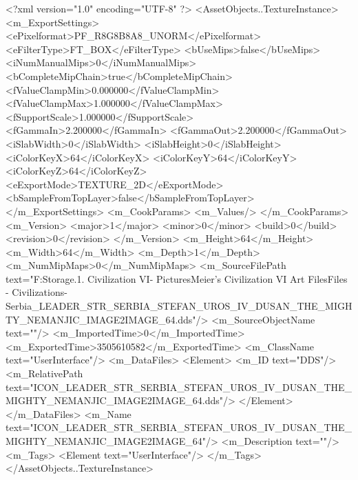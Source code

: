 <?xml version="1.0" encoding="UTF-8" ?>
<AssetObjects..TextureInstance>
	<m_ExportSettings>
		<ePixelformat>PF_R8G8B8A8_UNORM</ePixelformat>
		<eFilterType>FT_BOX</eFilterType>
		<bUseMips>false</bUseMips>
		<iNumManualMips>0</iNumManualMips>
		<bCompleteMipChain>true</bCompleteMipChain>
		<fValueClampMin>0.000000</fValueClampMin>
		<fValueClampMax>1.000000</fValueClampMax>
		<fSupportScale>1.000000</fSupportScale>
		<fGammaIn>2.200000</fGammaIn>
		<fGammaOut>2.200000</fGammaOut>
		<iSlabWidth>0</iSlabWidth>
		<iSlabHeight>0</iSlabHeight>
		<iColorKeyX>64</iColorKeyX>
		<iColorKeyY>64</iColorKeyY>
		<iColorKeyZ>64</iColorKeyZ>
		<eExportMode>TEXTURE_2D</eExportMode>
		<bSampleFromTopLayer>false</bSampleFromTopLayer>
	</m_ExportSettings>
	<m_CookParams>
		<m_Values/>
	</m_CookParams>
	<m_Version>
		<major>1</major>
		<minor>0</minor>
		<build>0</build>
		<revision>0</revision>
	</m_Version>
	<m_Height>64</m_Height>
	<m_Width>64</m_Width>
	<m_Depth>1</m_Depth>
	<m_NumMipMaps>0</m_NumMipMaps>
	<m_SourceFilePath text="F:\Mod Storage\2.1. Civilization VI\Mods\Archive - Pictures\Sid Meier's Civilization VI Art Files\Art Files - Civilizations\Civilization - Serbia\ICON_LEADER_STR_SERBIA_STEFAN_UROS_IV_DUSAN_THE_MIGHTY_NEMANJIC_IMAGE2IMAGE_64.dds"/>
	<m_SourceObjectName text=""/>
	<m_ImportedTime>0</m_ImportedTime>
	<m_ExportedTime>3505610582</m_ExportedTime>
	<m_ClassName text="UserInterface"/>
	<m_DataFiles>
		<Element>
			<m_ID text="DDS"/>
			<m_RelativePath text="ICON_LEADER_STR_SERBIA_STEFAN_UROS_IV_DUSAN_THE_MIGHTY_NEMANJIC_IMAGE2IMAGE_64.dds"/>
		</Element>
	</m_DataFiles>
	<m_Name text="ICON_LEADER_STR_SERBIA_STEFAN_UROS_IV_DUSAN_THE_MIGHTY_NEMANJIC_IMAGE2IMAGE_64"/>
	<m_Description text=""/>
	<m_Tags>
		<Element text="UserInterface"/>
	</m_Tags>
</AssetObjects..TextureInstance>

